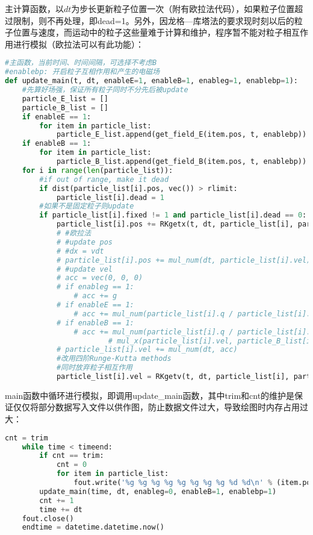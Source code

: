 \documentclass[UTF-8,cs4size]{ctexart}
\begin{document}
主计算函数，以$dt$为步长更新粒子位置一次（附有欧拉法代码），如果粒子位置超过限制，则不再处理，即dead=1。另外，因龙格—库塔法的要求现时刻以后的粒子位置与速度，而运动中的粒子这些量难于计算和维护，程序暂不能对粒子相互作用进行模拟（欧拉法可以有此功能）：
\begin{lstlisting}[language=Python]
#主函数，当前时间、时间间隔，可选择不考虑B
#enablebp: 开启粒子互相作用和产生的电磁场
def update_main(t, dt, enableE=1, enableB=1, enableg=1, enablebp=1):
    #先算好场强，保证所有粒子同时不分先后被update
    particle_E_list = []
    particle_B_list = []
    if enableE == 1:
        for item in particle_list:
            particle_E_list.append(get_field_E(item.pos, t, enablebp))
    if enableB == 1:
        for item in particle_list:
            particle_B_list.append(get_field_B(item.pos, t, enablebp))
    for i in range(len(particle_list)):
        #if out of range, make it dead 
        if dist(particle_list[i].pos, vec()) > rlimit:
            particle_list[i].dead = 1
        #如果不是固定粒子则update
        if particle_list[i].fixed != 1 and particle_list[i].dead == 0:
            particle_list[i].pos += RKgetx(t, dt, particle_list[i], particle_E_list[i], particle_B_list[i], enableg, enableE, enableB)
            # #欧拉法
            # #update pos
            # #dx = vdt
            # particle_list[i].pos += mul_num(dt, particle_list[i].vel)
            # #update vel
            # acc = vec(0, 0, 0)
            # if enableg == 1:
                # acc += g
            # if enableE == 1:
                # acc += mul_num(particle_list[i].q / particle_list[i].m, particle_E_list[i])
            # if enableB == 1:
                # acc += mul_num(particle_list[i].q / particle_list[i].m, \
                        # mul_x(particle_list[i].vel, particle_B_list[i]))
            # particle_list[i].vel += mul_num(dt, acc)
            #改用四阶Runge-Kutta methods
            #同时放弃粒子相互作用
            particle_list[i].vel = RKgetv(t, dt, particle_list[i], particle_E_list[i], particle_B_list[i], enableg=0, enableE=1, enableB=1)
\end{lstlisting}
main函数中循环进行模拟，即调用update\_main函数，其中trim和cnt的维护是保证仅仅将部分数据写入文件以供作图，防止数据文件过大，导致绘图时内存占用过大：
\begin{lstlisting}[language=Python]
    cnt = trim
    while time < timeend:
        if cnt == trim:
            cnt = 0
            for item in particle_list:
                fout.write('%g %g %g %g %g %g %g %g %d %d\n' % (item.pos.x, item.pos.y, item.pos.z, item.vel.x, item.vel.y, item.vel.z, item.q, item.m, item.fixed, item.dead))
        update_main(time, dt, enableg=0, enableB=1, enablebp=1)
        cnt += 1
        time += dt
    fout.close()
    endtime = datetime.datetime.now()
\end{lstlisting}
\end{document}
